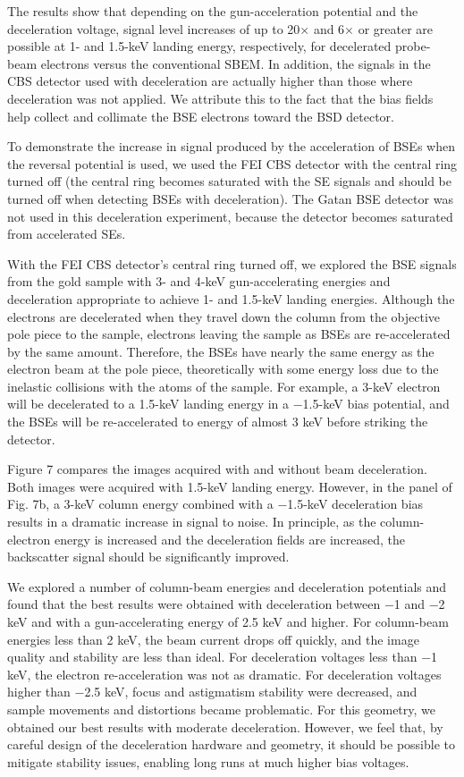 \documentclass{article}
\begin{document}
The results show that depending on the gun-acceleration potential and the deceleration voltage, signal level increases of up to 20× and 6× or greater are possible at 1- and 1.5-keV landing energy, respectively, for decelerated probe-beam electrons versus the conventional SBEM. In addition, the signals in the CBS detector used with deceleration are actually higher than those where deceleration was not applied. We attribute this to the fact that the bias fields help collect and collimate the BSE electrons toward the BSD detector.

To demonstrate the increase in signal produced by the acceleration of BSEs when the reversal potential is used, we used the FEI CBS detector with the central ring turned off (the central ring becomes saturated with the SE signals and should be turned off when detecting BSEs with deceleration). The Gatan BSE detector was not used in this deceleration experiment, because the detector becomes saturated from accelerated SEs.

With the FEI CBS detector’s central ring turned off, we explored the BSE signals from the gold sample with 3- and 4-keV gun-accelerating energies and deceleration appropriate to achieve 1- and 1.5-keV landing energies. Although the electrons are decelerated when they travel down the column from the objective pole piece to the sample, electrons leaving the sample as BSEs are re-accelerated by the same amount. Therefore, the BSEs have nearly the same energy as the electron beam at the pole piece, theoretically with some energy loss due to the inelastic collisions with the atoms of the sample. For example, a 3-keV electron will be decelerated to a 1.5-keV landing energy in a −1.5-keV bias potential, and the BSEs will be re-accelerated to energy of almost 3 keV before striking the detector.

Figure 7 compares the images acquired with and without beam deceleration. Both images were acquired with 1.5-keV landing energy. However, in the panel of Fig. 7b, a 3-keV column energy combined with a −1.5-keV deceleration bias results in a dramatic increase in signal to noise. In principle, as the column-electron energy is increased and the deceleration fields are increased, the backscatter signal should be significantly improved.

We explored a number of column-beam energies and deceleration potentials and found that the best results were obtained with deceleration between −1 and −2 keV and with a gun-accelerating energy of 2.5 keV and higher. For column-beam energies less than 2 keV, the beam current drops off quickly, and the image quality and stability are less than ideal. For deceleration voltages less than −1 keV, the electron re-acceleration was not as dramatic. For deceleration voltages higher than −2.5 keV, focus and astigmatism stability were decreased, and sample movements and distortions became problematic. For this geometry, we obtained our best results with moderate deceleration. However, we feel that, by careful design of the deceleration hardware and geometry, it should be possible to mitigate stability issues, enabling long runs at much higher bias voltages.
\end{document}
